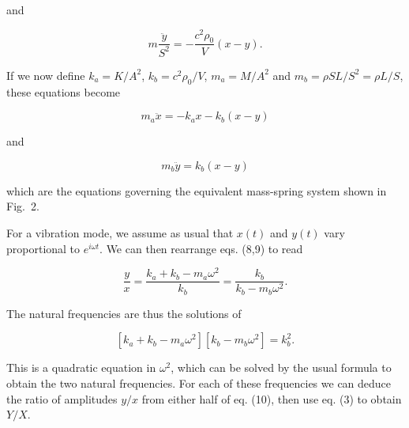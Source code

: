   \noindent{}and 

  \begin{equation*}m \dfrac{\ddot{y}}{S^2}=- \dfrac{c^2 \rho_0}{V} (x-y) . 
  \tag{7}\end{equation*} 

  If we now define $k_a=K/A^2$, $k_b=c^2 \rho_0/V$, $m_a=M/A^2$ and $m_b=\rho 
  SL/S^2 =\rho L/S$, these equations become 

  \begin{equation*}m_a \ddot{x}=-k_a x -k_b(x-y) \tag{8}\end{equation*} 

  \noindent{}and 

  \begin{equation*}m_b \ddot{y}=k_b (x-y) \tag{9}\end{equation*} 

  \noindent{}which are the equations governing the equivalent mass-spring 
  system shown in Fig.\ 2. 


  For a vibration mode, we assume as usual that $x(t)$ and $y(t)$ vary 
  proportional to $e^{i \omega t}$. We can then rearrange eqs. (8,9) to read 

  \begin{equation*}\dfrac{y}{x}=\dfrac{k_a+k_b-m_a \omega^2}{k_b} = 
  \dfrac{k_b}{k_b-m_b \omega^2} . \tag{10}\end{equation*} 

  The natural frequencies are thus the solutions of 

  \begin{equation*}\left[ k_a+k_b-m_a \omega^2 \right] \left[ k_b-m_b \omega^2 
  \right] = k_b^2 . \tag{11}\end{equation*} 

  This is a quadratic equation in $\omega^2$, which can be solved by the usual 
  formula to obtain the two natural frequencies. For each of these frequencies 
  we can deduce the ratio of amplitudes $y/x$ from either half of eq. (10), 
  then use eq. (3) to obtain $Y/X$. 

